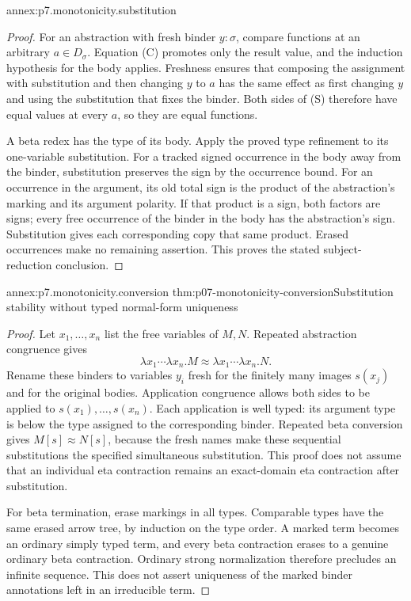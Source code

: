 \begin{annexitem}{annex:p7.monotonicity.substitution}
\begin{proof}
For an abstraction with fresh binder \(y:\sigma\), compare functions at
an arbitrary \(a\in D_\sigma\). Equation (C) promotes only the result
value, and the induction hypothesis for the body applies.
Freshness ensures that composing the assignment with substitution and
then changing \(y\) to \(a\) has the same effect as first changing \(y\)
and using the substitution that fixes the binder. Both sides of (S)
therefore have equal values at every \(a\), so they are equal functions.

A beta redex has the type of its body. Apply the proved type refinement
to its one-variable substitution. For a tracked signed occurrence in the
body away from the binder, substitution preserves the sign by the
occurrence bound. For an occurrence in the argument, its old total sign
is the product of the abstraction's marking and its argument polarity.
If that product is a sign, both factors are signs; every free occurrence
of the binder in the body has the abstraction's sign. Substitution gives
each corresponding copy that same product. Erased occurrences make no
remaining assertion. This proves the stated subject-reduction conclusion.
\end{proof}
\end{annexitem}

\begin{annexitem}{annex:p7.monotonicity.conversion}
 {thm:p07-monotonicity-conversion}{Substitution stability without typed normal-form uniqueness}
\begin{proof}
Let \(x_1,\ldots,x_n\) list the free variables of \(M,N\).
Repeated abstraction congruence gives
\[
 \lambda x_1\cdots\lambda x_n.M
 \approx
 \lambda x_1\cdots\lambda x_n.N .
\]
Rename these binders to variables \(y_i\) fresh for the finitely many
images \(s(x_j)\) and for the original bodies. Application congruence
allows both sides to be applied to \(s(x_1),\ldots,s(x_n)\).
Each application is well typed: its argument type is below the type
assigned to the corresponding binder. Repeated beta conversion gives
\(M[s]\approx N[s]\), because the fresh names make these sequential
substitutions the specified simultaneous substitution. This proof does
not assume that an individual eta contraction remains an exact-domain
eta contraction after substitution.

For beta termination, erase markings in all types. Comparable types have the
same erased arrow tree, by induction on the type order. A marked term
becomes an ordinary simply typed term, and every beta contraction
erases to a genuine ordinary beta contraction. Ordinary strong normalization
therefore precludes an infinite sequence. This does not assert uniqueness
of the marked binder annotations left in an irreducible term.
\end{proof}
\end{annexitem}

